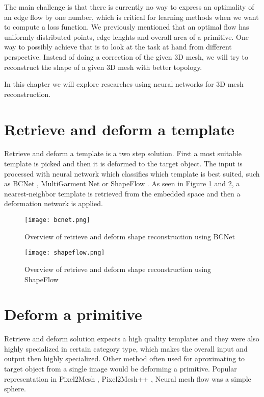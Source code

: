 The main challenge is that there is currently no way to express an optimality of an edge flow by one number, which is critical for learning methods when we want to compute a loss function. We previously mentioned that an optimal flow has uniformly distributed points, edge lenghts and overall area of a primitive. One way to possibly achieve that is to look at the task at hand from different perspective. Instead of doing a correction of the given 3D mesh, we will try to reconstruct the shape of a given 3D mesh with better topology.

In this chapter we will explore researches using neural networks for 3D mesh reconstruction. 

\section{Retrieve and deform a template}

Retrieve and deform a template is a two step solution. First a most suitable template is picked and then it is deformed to the target object. The input is processed with neural network which classifies which template is best suited, such as BCNet \cite{bcnet}, MultiGarment Net\cite{mgn} or ShapeFlow \cite{shapeflow}. As seen in Figure \ref{fig:bcnet} and \ref{fig:shapeflow}, a nearest-neighbor template is retrieved from the embedded space and then a deformation network is applied.

\begin{figure}[h]
    \centering
    \texttt{[image: bcnet.png]}
    \caption{Overview of retrieve and deform shape reconstruction using BCNet \cite{bcnet}}
    \label{fig:bcnet}
\end{figure}

\begin{figure}[h]
    \centering
    \texttt{[image: shapeflow.png]}
    \caption{Overview of retrieve and deform shape reconstruction using ShapeFlow \cite{shapeflow}}
    \label{fig:shapeflow}
\end{figure}

\section{Deform a primitive}

Retrieve and deform solution expects a high quality templates and they were also highly specialized in certain category type, which makes the overall input and output then highly specialized. Other method often used for aproximating to target object from a single image would be deforming a primitive. Popular representation in Pixel2Mesh \cite{p2m}, Pixel2Mesh++ \cite{p2mpp}, Neural mesh flow \cite{neuralFlow} was a simple sphere. 

